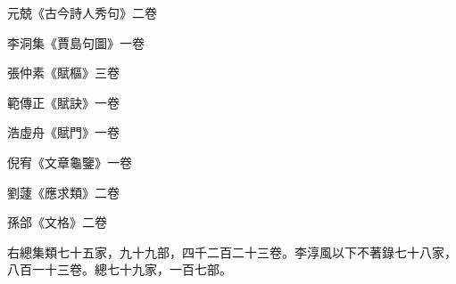 \begin{pinyinscope}
 元兢《古今詩人秀句》二卷



 李洞集《賈島句圖》一卷



 張仲素《賦樞》三卷



 範傳正《賦訣》一卷



 浩虛舟《賦門》一卷



 倪宥《文章龜鑒》一卷



 劉蘧《應求類》二卷



 孫郃《文格》二卷



 右總集類七十五家，九十九部，四千二百二十三卷。李淳風以下不著錄七十八家，八百一十三卷。總七十九家，一百七部。



\end{pinyinscope}